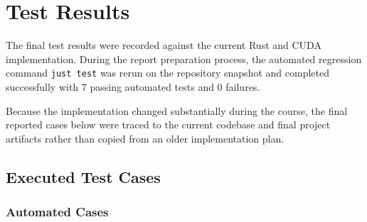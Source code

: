 \section{Test Results}
\label{sec:testing}

The final test results were recorded against the current Rust and CUDA implementation. During
the report preparation process, the automated regression command \texttt{just test} was rerun on
the repository snapshot and completed successfully with 7 passing automated tests and 0
failures.

Because the implementation changed substantially during the course, the final reported cases
below were traced to the current codebase and final project artifacts rather than copied from an
older implementation plan.

\subsection{Executed Test Cases}

\subsubsection{Automated Cases}


